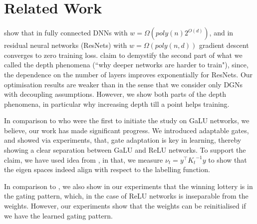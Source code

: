 \section{Related Work}
\cite{dudnn} show that in fully connected DNNs with $w=\Omega(poly(n)2^{O(d)})$, and in residual neural networks (ResNets) with $w=\Omega(poly(n,d))$ gradient descent converges to zero training loss. \cite{dudnn} claim to demystify the second part of what we called the depth phenomena (``why deeper networks are harder to train"), since, the dependence on the number of layers improves exponentially for ResNets. Our optimisation results are weaker than \cite{dudnn} in the sense that we consider only DGNs with decoupling assumptions. However, we show both parts of the depth phenomena, in particular why increasing depth till a point helps training. 

\begin{comment}Further, the \emph{algebraic} nicety due to \emph{Hadamard} product decomposition of the Gram matrix is a useful take away. In addition, the connection to how the sub-network overlap is a conceptual gain. 
In comparison to \cite{dudln} the gain in our work is that, thanks to the path-view, we obtain a single expression for $\E{K_0}$ which can be applied to deep linear networks, GaLU networks and any networks whose gating values are known and fixed. Both \cite{dnn,dln} are analytically more involved, in that they provide guaranteed rates of converges with high probability, and in comparison, our work has stopped with the variance calculation.
\end{comment}
In comparison to \cite{sss} who were the first to initiate the study on GaLU networks, we believe, our work has made significant progress. We introduced adaptable gates, and showed via experiments, that, gate adaptation is key in learning, thereby showing a clear separation between GaLU and ReLU networks. To support the claim, we have used idea from \cite{arora}, in that, we measure $\nu_t=y^\top {K_t}^{-1}y$ to show that the eigen spaces indeed align with respect to the labelling function.

In comparison to \cite{lottery}, we also show in our experiments that the winning lottery is in the gating pattern, which, in the case of ReLU networks is inseparable from the weights. However, our experiments show that the weights can be reinitialised if we have the learned gating pattern.

